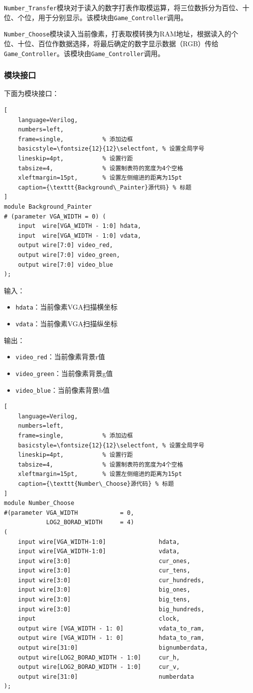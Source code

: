 \texttt{Number\_Transfer}模块对于读入的数字打表作取模运算，将三位数拆分为百位、十位、个位，用于分别显示。该模块由\texttt{Game\_Controller}调用。

\texttt{Number\_Choose}模块读入当前像素，打表取模转换为RAM地址，根据读入的个位、十位、百位作数据选择，将最后确定的数字显示数据（RGB）传给\texttt{Game\_Controller}。该模块由\texttt{Game\_Controller}调用。

\subsubsection{模块接口}
下面为模块接口：
\begin{lstlisting}[
    language=Verilog,
    numbers=left,
    frame=single,           % 添加边框
    basicstyle=\fontsize{12}{12}\selectfont, % 设置全局字号
    lineskip=4pt,           % 设置行距
    tabsize=4,              % 设置制表符的宽度为4个空格
    xleftmargin=15pt,       % 设置左侧缩进的距离为15pt
    caption={\texttt{Background\_Painter}源代码} % 标题
] 
module Background_Painter
# (parameter VGA_WIDTH = 0) (
	input  wire[VGA_WIDTH - 1:0] hdata,
	input  wire[VGA_WIDTH - 1:0] vdata,
	output wire[7:0] video_red,
	output wire[7:0] video_green,
	output wire[7:0] video_blue
);
\end{lstlisting}

输入：
\begin{itemize}
    \item \texttt{hdata}：当前像素VGA扫描横坐标
    \item \texttt{vdata}：当前像素VGA扫描纵坐标
\end{itemize}

输出：
\begin{itemize}
    \item \texttt{video\_red}：当前像素背景r值
    \item \texttt{video\_green}：当前像素背景g值
    \item \texttt{video\_blue}：当前像素背景b值
\end{itemize}

\begin{lstlisting}[
    language=Verilog,
    numbers=left,
    frame=single,           % 添加边框
    basicstyle=\fontsize{12}{12}\selectfont, % 设置全局字号
    lineskip=4pt,           % 设置行距
    tabsize=4,              % 设置制表符的宽度为4个空格
    xleftmargin=15pt,       % 设置左侧缩进的距离为15pt
    caption={\texttt{Number\_Choose}源代码} % 标题
] 
module Number_Choose
#(parameter VGA_WIDTH            = 0,
			LOG2_BORAD_WIDTH     = 4)
(
	input wire[VGA_WIDTH-1:0] 				hdata,
	input wire[VGA_WIDTH-1:0]				vdata,
	input wire[3:0]							cur_ones,
	input wire[3:0]							cur_tens,
	input wire[3:0]							cur_hundreds,
	input wire[3:0]							big_ones,
	input wire[3:0]							big_tens,
	input wire[3:0]							big_hundreds,
	input									clock,
    output wire [VGA_WIDTH - 1: 0]          vdata_to_ram,
    output wire [VGA_WIDTH - 1: 0]          hdata_to_ram,
	output wire[31:0]						bignumberdata,
	output wire[LOG2_BORAD_WIDTH - 1:0]		cur_h,
	output wire[LOG2_BORAD_WIDTH - 1:0]		cur_v,
	output wire[31:0]						numberdata
);
\end{lstlisting}

